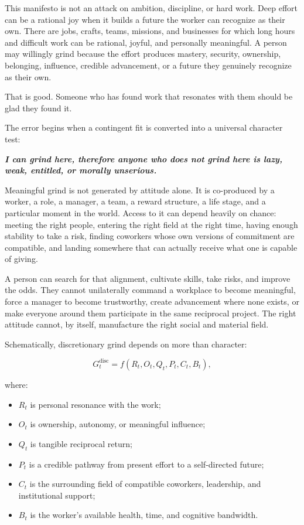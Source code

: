 \documentclass[11pt,oneside]{article}
\providecommand{\tightlist}{%
  \setlength{\itemsep}{0.22em}\setlength{\parskip}{0pt}}
\renewenvironment{quote}
  {\begin{tcolorbox}[
      enhanced,
      breakable,
      colback=ManifestLight,
      colframe=ManifestRule,
      boxrule=0pt,
      leftrule=3pt,
      arc=0pt,
      outer arc=0pt,
      left=10pt,right=10pt,top=8pt,bottom=8pt,
      before skip=0.8em,after skip=0.8em
    ]\itshape}
  {\end{tcolorbox}}
\begin{document}
This manifesto is not an attack on ambition, discipline, or hard work.
Deep effort can be a rational joy when it builds a future the worker can
recognize as their own. There are jobs, crafts, teams, missions, and
businesses for which long hours and difficult work can be rational,
joyful, and personally meaningful. A person may willingly grind because
the effort produces mastery, security, ownership, belonging, influence,
credible advancement, or a future they genuinely recognize as their own.

That is good. Someone who has found work that resonates with them should
be glad they found it.

The error begins when a contingent fit is converted into a universal
character test:

\begin{quote}
\textbf{I can grind here, therefore anyone who does not grind here is
lazy, weak, entitled, or morally unserious.}
\end{quote}

Meaningful grind is not generated by attitude alone. It is co-produced
by a worker, a role, a manager, a team, a reward structure, a life
stage, and a particular moment in the world. Access to it can depend
heavily on chance: meeting the right people, entering the right field at
the right time, having enough stability to take a risk, finding
coworkers whose own versions of commitment are compatible, and landing
somewhere that can actually receive what one is capable of giving.

A person can search for that alignment, cultivate skills, take risks,
and improve the odds. They cannot unilaterally command a workplace to
become meaningful, force a manager to become trustworthy, create
advancement where none exists, or make everyone around them participate
in the same reciprocal project. The right attitude cannot, by itself,
manufacture the right social and material field.

Schematically, discretionary grind depends on more than character:

\[
G_t^{\mathrm{disc}}
=
f(R_t,O_t,Q_t,P_t,C_t,B_t),
\]

where:

\begin{itemize}
\tightlist
\item
  \(R_t\) is personal resonance with the work;
\item
  \(O_t\) is ownership, autonomy, or meaningful influence;
\item
  \(Q_t\) is tangible reciprocal return;
\item
  \(P_t\) is a credible pathway from present effort to a self-directed
  future;
\item
  \(C_t\) is the surrounding field of compatible coworkers, leadership,
  and institutional support;
\item
  \(B_t\) is the worker's available health, time, and cognitive
  bandwidth.
\end{itemize}
\end{document}

